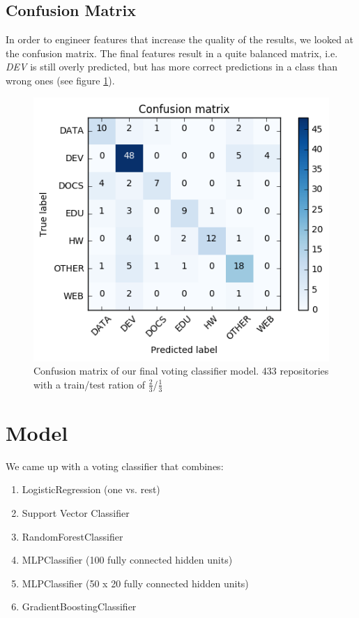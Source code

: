 \documentclass[a4paper]{scrartcl}
\begin{document}


	\subsection{Confusion Matrix} %
	\label{sub:confusion_matrix}
	
	In order to engineer features that increase the quality of the results, we looked at the confusion matrix. The final features result in a quite balanced matrix, i.e. \emph{DEV} is still overly predicted, but has more correct predictions in a class than wrong ones (see figure \ref{fig:confusion}).

	\begin{figure}[h!]
		\centering
		\includegraphics[width=0.75\linewidth]{figures/confusion.png}
		\caption{Confusion matrix of our final voting classifier model. 433 repositories with a train/test ration of $\frac{2}{3}$/$\frac{1}{3}$}
		\label{fig:confusion}
	\end{figure}



\clearpage
\section{Model} %
\label{sec:model}

We came up with a voting classifier that combines:

\begin{enumerate}
	\item LogisticRegression (one vs. rest)
	\item Support Vector Classifier
	\item RandomForestClassifier
	\item MLPClassifier (100 fully connected hidden units)
	\item MLPClassifier (50 x 20 fully connected hidden units)
	\item GradientBoostingClassifier
\end{enumerate}
\end{document}
